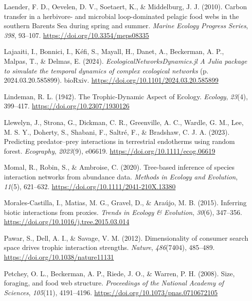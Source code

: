 \documentclass[
]{article}
\newlength{\cslhangindent}
\newenvironment{CSLReferences}[2] %
 {\begin{list}{}{%
  \setlength{\itemindent}{0pt}
  \setlength{\leftmargin}{0pt}
  \setlength{\parsep}{0pt}
  \ifodd #1
   \setlength{\leftmargin}{\cslhangindent}
   \setlength{\itemindent}{-1\cslhangindent}
  \fi
  \setlength{\itemsep}{#2\baselineskip}}}
 {\end{list}}
\begin{document}
\begin{CSLReferences}{1}{0}
Laender, F. D., Oevelen, D. V., Soetaert, K., \& Middelburg, J. J.
(2010). Carbon transfer in a herbivore- and microbial loop-dominated
pelagic food webs in the southern {Barents Sea} during spring and
summer. \emph{Marine Ecology Progress Series}, \emph{398}, 93--107.
\url{https://doi.org/10.3354/meps08335}

Lajaaiti, I., Bonnici, I., Kéfi, S., Mayall, H., Danet, A., Beckerman,
A. P., Malpas, T., \& Delmas, E. (2024).
\emph{{EcologicalNetworksDynamics}.jl {A Julia} package to simulate the
temporal dynamics of complex ecological networks} (p.
2024.03.20.585899). bioRxiv.
\url{https://doi.org/10.1101/2024.03.20.585899}

Lindeman, R. L. (1942). The {Trophic-Dynamic Aspect} of {Ecology}.
\emph{Ecology}, \emph{23}(4), 399--417.
\url{https://doi.org/10.2307/1930126}

Llewelyn, J., Strona, G., Dickman, C. R., Greenville, A. C., Wardle, G.
M., Lee, M. S. Y., Doherty, S., Shabani, F., Saltré, F., \& Bradshaw, C.
J. A. (2023). Predicting predator--prey interactions in terrestrial
endotherms using random forest. \emph{Ecography}, \emph{2023}(9),
e06619. \url{https://doi.org/10.1111/ecog.06619}

Momal, R., Robin, S., \& Ambroise, C. (2020). Tree-based inference of
species interaction networks from abundance data. \emph{Methods in
Ecology and Evolution}, \emph{11}(5), 621--632.
\url{https://doi.org/10.1111/2041-210X.13380}

Morales-Castilla, I., Matias, M. G., Gravel, D., \& Araújo, M. B.
(2015). Inferring biotic interactions from proxies. \emph{Trends in
Ecology \& Evolution}, \emph{30}(6), 347--356.
\url{https://doi.org/10.1016/j.tree.2015.03.014}

Pawar, S., Dell, A. I., \& Savage, V. M. (2012). Dimensionality of
consumer search space drives trophic interaction strengths.
\emph{Nature}, \emph{486}(7404), 485--489.
\url{https://doi.org/10.1038/nature11131}

Petchey, O. L., Beckerman, A. P., Riede, J. O., \& Warren, P. H. (2008).
Size, foraging, and food web structure. \emph{Proceedings of the
National Academy of Sciences}, \emph{105}(11), 4191--4196.
\url{https://doi.org/10.1073/pnas.0710672105}


\end{CSLReferences}
\end{document}
